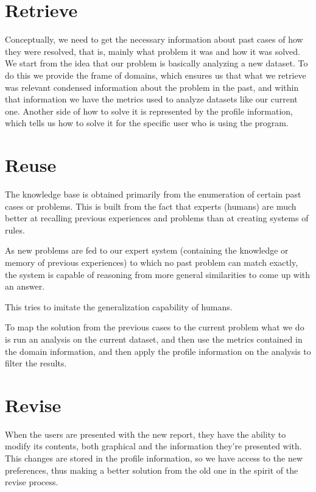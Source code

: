 \section{Retrieve}
\label{cap5:sec:retrieve}

Conceptually, we need to get the necessary information about past cases of how they were resolved, that is, mainly what problem it was and how it was solved.
We start from the idea that our problem is basically analyzing a new dataset.
To do this we provide the frame of domains, which ensures us that what we retrieve was relevant condensed information about the problem in the past, and within that information we have the metrics used to analyze datasets like our current one.
Another side of how to solve it is represented by the profile information, which tells us how to solve it for the specific user who is using the program.

\section{Reuse}
\label{cap5:sec:reuse}
The knowledge base is obtained primarily from the enumeration of certain past cases or problems. This is built from the fact that experts (humans) are much better at recalling previous experiences and problems than at creating systems of rules. 

As new problems are fed to our expert system (containing the knowledge or memory of previous experiences) to which no past problem can match exactly, the system is capable of reasoning from more general similarities to come up with an answer. 

This tries to imitate the generalization capability of humans.

To map the solution from the previous cases to the current problem what we do is run an analysis on the current dataset, and then use the metrics contained in the domain information, and then apply the profile information on the analysis to filter the results.

\section{Revise}
\label{cap5:sec:revise}
When the users are presented with the new report, they have the ability to modify its contents, both graphical and the information they're presented with. This changes are stored in the profile information, so we have access to the new preferences, thus making a better solution from the old one in the spirit of the revise process.

